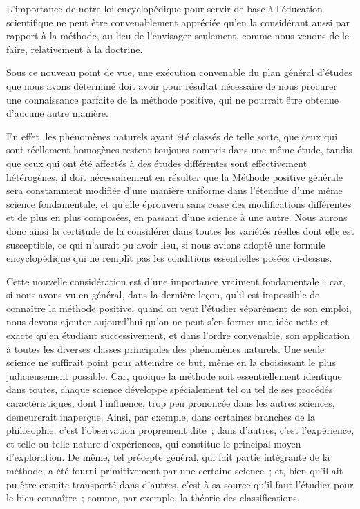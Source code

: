 \documentclass[french,twoside]{book} %
\begin{document}
L’importance de notre loi encyclopédique pour servir de base à l’éducation scientifique ne peut être convenablement appréciée qu’en la considérant aussi par rapport à la méthode, au lieu de l’envisager seulement, comme nous venons de le faire, relativement à la doctrine.\par
Sous ce nouveau point de vue, une exécution convenable du plan général d’études que nous avons déterminé doit avoir pour résultat nécessaire de nous procurer une connaissance parfaite de la méthode positive, qui ne pourrait être obtenue d’aucune autre manière.\par
En effet, les phénomènes naturels ayant été classés de telle sorte, que ceux qui sont réellement homogènes restent toujours compris dans une même étude, tandis que ceux qui ont été affectés à des études différentes sont effectivement hétérogènes, il doit nécessairement en résulter que la Méthode positive générale sera constamment modifiée d’une manière uniforme dans l’étendue d’une même science fondamentale, et qu’elle éprouvera sans cesse des modifications différentes et de plus en plus composées, en passant d’une science à une autre. Nous aurons donc ainsi la certitude de la considérer dans toutes les variétés réelles dont elle est susceptible, ce qui n’aurait pu avoir lieu, si nous avions adopté une formule encyclopédique qui ne remplît pas les conditions essentielles posées ci-dessus.\par
Cette nouvelle considération est d’une importance vraiment fondamentale ; car, si nous avons vu en général, dans la dernière leçon, qu’il est impossible de connaître la méthode positive, quand on veut l’étudier séparément de son emploi, nous devons ajouter aujourd’hui qu’on ne peut s’en former une idée nette et exacte qu’en étudiant successivement, et dans l’ordre convenable, son application à toutes les diverses classes principales des phénomènes naturels. Une seule science ne suffirait point pour atteindre ce but, même en la choisissant le plus judicieusement possible. Car, quoique la méthode soit essentiellement identique dans toutes, chaque science développe spécialement tel ou tel de ses procédés caractéristiques, dont l’influence, trop peu prononcée dans les autres sciences, demeurerait inaperçue. Ainsi, par exemple, dans certaines branches de la philosophie, c’est l’observation proprement dite ; dans d’autres, c’est l’expérience, et telle ou telle nature d’expériences, qui constitue le principal moyen d’exploration. De même, tel précepte général, qui fait partie intégrante de la méthode, a été fourni primitivement par une certaine science ; et, bien qu’il ait pu être ensuite transporté dans d’autres, c’est à sa source qu’il faut l’étudier pour le bien connaître ; comme, par exemple, la théorie des classifications.\par
\end{document}
